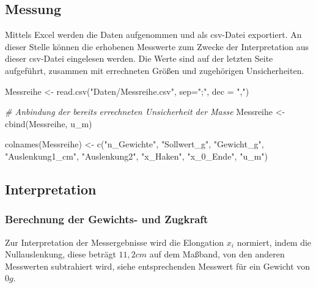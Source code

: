 \documentclass[
  9pt,
]{article}
\newenvironment{Shaded}{\begin{snugshade}}{\end{snugshade}}
\newcommand{\AttributeTok}[1]{\textcolor[rgb]{0.77,0.63,0.00}{#1}}
\newcommand{\CommentTok}[1]{\textcolor[rgb]{0.56,0.35,0.01}{\textit{#1}}}
\newcommand{\FunctionTok}[1]{\textcolor[rgb]{0.00,0.00,0.00}{#1}}
\newcommand{\NormalTok}[1]{#1}
\newcommand{\OtherTok}[1]{\textcolor[rgb]{0.56,0.35,0.01}{#1}}
\newcommand{\StringTok}[1]{\textcolor[rgb]{0.31,0.60,0.02}{#1}}
\begin{document}
\hypertarget{messung}{%
\subsection{Messung}\label{messung}}

Mittels Excel werden die Daten aufgenommen und als csv-Datei exportiert.
An dieser Stelle können die erhobenen Messwerte zum Zwecke der
Interpretation aus dieser csv-Datei eingelesen werden. Die Werte sind
auf der letzten Seite aufgeführt, zusammen mit errechneten Größen und
zugehörigen Unsicherheiten.

\begin{Shaded}
\begin{Highlighting}[]
\NormalTok{Messreihe }\OtherTok{\textless{}{-}} \FunctionTok{read.csv}\NormalTok{(}\StringTok{"Daten/Messreihe.csv"}\NormalTok{, }\AttributeTok{sep=}\StringTok{";"}\NormalTok{, }\AttributeTok{dec =} \StringTok{","}\NormalTok{)}

\CommentTok{\# Anbindung der bereits errechneten Unsicherheit der Masse}
\NormalTok{Messreihe }\OtherTok{\textless{}{-}} \FunctionTok{cbind}\NormalTok{(Messreihe, u\_m)}

\FunctionTok{colnames}\NormalTok{(Messreihe) }\OtherTok{\textless{}{-}} \FunctionTok{c}\NormalTok{(}\StringTok{"n\_Gewichte"}\NormalTok{, }\StringTok{"Sollwert\_g"}\NormalTok{, }\StringTok{"Gewicht\_g"}\NormalTok{, }
                         \StringTok{"Auslenkung1\_cm"}\NormalTok{,  }\StringTok{"Auslenkung2"}\NormalTok{, }\StringTok{"x\_Haken"}\NormalTok{, }
                         \StringTok{"x\_0\_Ende"}\NormalTok{, }\StringTok{"u\_m"}\NormalTok{)}
\end{Highlighting}
\end{Shaded}

\hypertarget{interpretation}{%
\subsection{Interpretation}\label{interpretation}}

\hypertarget{berechnung-der-gewichts--und-zugkraft}{%
\subsubsection{Berechnung der Gewichts- und
Zugkraft}\label{berechnung-der-gewichts--und-zugkraft}}

Zur Interpretation der Messergebnisse wird die Elongation \(x_i\)
normiert, indem die Nullauslenkung, diese beträgt \(11,2 cm\) auf dem
Maßband, von den anderen Messwerten subtrahiert wird, siehe
entsprechenden Messwert für ein Gewicht von \(0g\).
\end{document}
